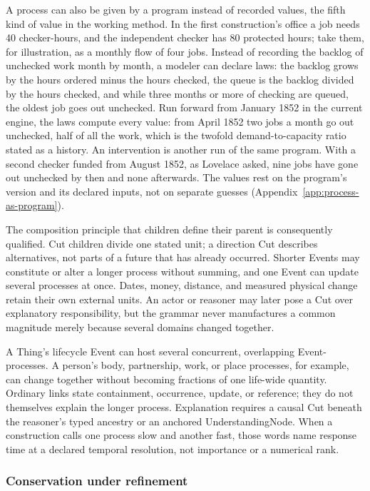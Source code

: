 \documentclass[11pt,a4paper]{article}
\begin{document}
A process can also be given by a program instead of recorded values, the fifth
kind of value in the working method. In the first construction's office a job
needs 40 checker-hours, and the independent checker has 80 protected hours;
take them, for illustration, as a monthly flow of four jobs. Instead of
recording the backlog of unchecked work month by month, a modeler can declare
laws: the backlog grows by the hours ordered minus the hours checked, the queue
is the backlog divided by the hours checked, and while three months or more of
checking are queued, the oldest job goes out unchecked. Run forward from January
1852 in the current engine, the laws compute every value: from April 1852 two
jobs a month go out unchecked, half of all the work, which is the twofold
demand-to-capacity ratio stated as a history. An intervention is another run of
the same program. With a second checker funded from August 1852, as Lovelace
asked, nine jobs have gone out unchecked by then and none afterwards. The values
rest on the program's version and its declared inputs, not on separate guesses
(Appendix~\ref{app:process-as-program}).

The composition principle that children define their parent is consequently
qualified. Cut children divide one stated unit; a direction Cut describes alternatives, not
parts of a future that has already occurred. Shorter Events may
constitute or alter a longer process without summing, and one Event can update
several processes at once. Dates, money, distance, and measured physical change
retain their own external units. An actor or reasoner may later pose a Cut over
explanatory responsibility, but the grammar never manufactures a common magnitude merely
because several domains changed together.

A Thing's lifecycle Event can host several concurrent, overlapping
Event-processes. A person's body, partnership, work, or place processes, for
example, can change together without becoming fractions of one life-wide
quantity. Ordinary links state containment, occurrence, update, or reference;
they do not themselves explain the longer process. Explanation requires a
causal Cut beneath the reasoner's typed ancestry or an anchored
UnderstandingNode. When a construction
calls one process slow and another fast, those words name response time at a
declared temporal resolution, not importance or a numerical rank.

\subsubsection{Conservation under refinement}
\label{sec:conservation}
\end{document}
